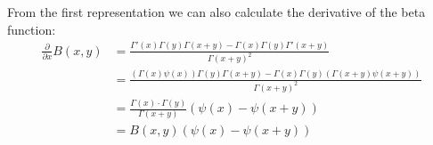 From the first representation we can also calculate the derivative of the beta
function:
\begin{align}
    \frac{\partial}{\partial x} B(x, y)
    &= \frac{
                \Gamma'(x)\Gamma(y)\Gamma(x+y) - \Gamma(x)\Gamma(y)\Gamma'(x+y) 
            }{
                \Gamma(x+y)^2
            } \nonumber \\
    &= \frac{
                (\Gamma(x)\psi(x))\Gamma(y)\Gamma(x+y) -
                \Gamma(x)\Gamma(y)(\Gamma(x+y)\psi(x+y))
            }{
                \Gamma(x+y)^2
            } \nonumber \\
    &= \frac{\Gamma(x)\cdot\Gamma(y)}{\Gamma(x+y)}\left(\psi(x) - \psi(x+y)\right)
        \nonumber \\
    &= B(x,y)\left(\psi(x) - \psi(x+y)\right)
    \label{frm:beta_deriv}
\end{align}
